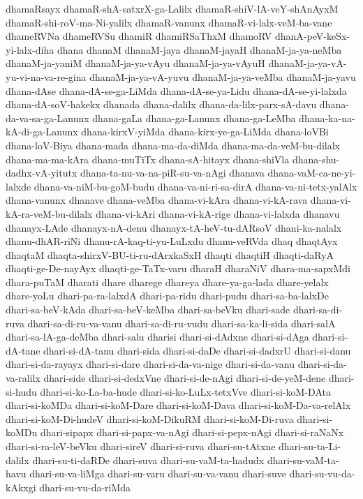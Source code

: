 {dhamaRsayx
dhamaR-shA-satxrX-ga-Lalilx
dhamaR-shiV-lA-veY-shAnAyxM
dhamaR-shi-roV-ma-Ni-yalilx
dhamaR-vanunx
dhamaR-vi-lalx-veM-ba-vane
dhameRVNa
dhameRVSu
dhamiR
dhamiRSaThxM
dhamoRV
dhanA-peV-keSx-yi-lalx-diha
dhana
dhanaM
dhanaM-jaya
dhanaM-jayaH
dhanaM-ja-ya-neMba
dhanaM-ja-yaniM
dhanaM-ja-ya-vAyu
dhanaM-ja-ya-vAyuH
dhanaM-ja-ya-vA-yu-vi-na-va-re-gina
dhanaM-ja-ya-vA-yuvu
dhanaM-ja-ya-veMba
dhanaM-ja-yavu
dhana-dAse
dhana-dA-se-ga-LiMda
dhana-dA-se-ya-Lidu
dhana-dA-se-yi-lalxda
dhana-dA-soV-hakekx
dhanada
dhana-dalilx
dhana-da-lilx-parx-sA-davu
dhana-da-va-sa-ga-Lanunx
dhana-gaLa
dhana-ga-Lanunx
dhana-ga-LeMba
dhana-ka-na-kA-di-ga-Lanunx
dhana-kirxV-yiMda
dhana-kirx-ye-ga-LiMda
dhana-loVBi
dhana-loV-Biya
dhana-mada
dhana-ma-da-diMda
dhana-ma-da-veM-bu-dilalx
dhana-ma-ma-kAra
dhana-muTiTx
dhana-sA-hitayx
dhana-shiVla
dhana-shu-dadhx-vA-yitutx
dhana-ta-nu-va-na-piR-su-va-nAgi
dhanava
dhana-vaM-ca-ne-yi-lalxde
dhana-va-niM-bu-goM-budu
dhana-va-ni-ri-sa-dirA
dhana-va-ni-tetx-yalAlx
dhana-vanunx
dhanave
dhana-veMba
dhana-vi-kAra
dhana-vi-kA-rava
dhana-vi-kA-ra-veM-bu-dilalx
dhana-vi-kAri
dhana-vi-kA-rige
dhana-vi-lalxda
dhanavu
dhanayx-LAde
dhanayx-nA-denu
dhanayx-tA-heV-tu-dARsoV
dhani-ka-nalalx
dhanu-dhAR-riNi
dhanu-rA-kaq-ti-yu-LuLxdu
dhanu-veRVda
dhaq
dhaqtAyx
dhaqtaM
dhaqta-shirxV-BU-ti-ru-dArxkaSxH
dhaqti
dhaqtiH
dhaqti-daRyA
dhaqti-ge-De-nayAyx
dhaqti-ge-TaTx-varu
dharaH
dharaNiV
dhara-ma-sapxMdi
dhara-puTaM
dharati
dhare
dharege
dhareya
dhare-ya-ga-lada
dhare-yelalx
dhare-yoLu
dhari-pa-ra-lalxdA
dhari-pa-ridu
dhari-pudu
dhari-sa-ba-lalxDe
dhari-sa-beV-kAda
dhari-sa-beV-keMba
dhari-sa-beVku
dhari-sade
dhari-sa-di-ruva
dhari-sa-di-ru-va-vanu
dhari-sa-di-ru-vudu
dhari-sa-ka-li-sida
dhari-salA
dhari-sa-lA-ga-deMba
dhari-salu
dharisi
dhari-si-dAdxne
dhari-si-dAga
dhari-si-dA-tane
dhari-si-dA-tanu
dhari-sida
dhari-si-daDe
dhari-si-dadxrU
dhari-si-danu
dhari-si-da-rayayx
dhari-si-dare
dhari-si-da-va-nige
dhari-si-da-vanu
dhari-si-da-va-ralilx
dhari-side
dhari-si-dedxVne
dhari-si-de-nAgi
dhari-si-de-yeM-dene
dhari-si-hudu
dhari-si-ko-La-ba-hude
dhari-si-ko-LuLx-tetxVve
dhari-si-koM-DAta
dhari-si-koMDa
dhari-si-koM-Dare
dhari-si-koM-Dava
dhari-si-koM-Da-va-relAlx
dhari-si-koM-Di-hudeV
dhari-si-koM-DikuRM
dhari-si-koM-Di-ruva
dhari-si-koMDu
dhari-sipapx
dhari-si-papx-va-nAgi
dhari-si-pepx-nAgi
dhari-si-raNaNx
dhari-si-ra-leV-beVku
dhari-sireV
dhari-si-ruva
dhari-su-tAtxne
dhari-su-ta-Li-dalilx
dhari-su-ti-daRDe
dhari-suva
dhari-su-vaM-ta-hadudx
dhari-su-vaM-ta-havu
dhari-su-va-liMga
dhari-su-varu
dhari-su-va-vanu
dhari-suve
dhari-su-vu-da-kAkxgi
dhari-su-vu-da-riMda
}
